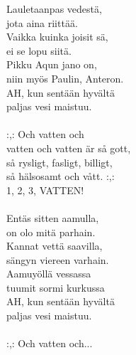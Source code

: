 
Lauletaanpas vedestä, \\ jota aina riittää. \\ Vaikka kuinka joisit sä, \\ ei se lopu siitä. \\ Pikku Aqun jano on, \\ niin myös Paulin, Anteron. \\ AH, kun sentään hyvältä \\ paljas vesi maistuu. \\ \hspace{10mm} \\ :,: Och vatten och \\ vatten och vatten är så gott, \\ så rysligt, fasligt, billigt, \\ så hälsosamt och vått. :,: \\ 1, 2, 3, VATTEN! \\ \hspace{10mm} \\ Entäs sitten aamulla, \\ on olo mitä parhain. \\ Kannat vettä saavilla, \\ sängyn viereen varhain. \\ Aamuyöllä vessassa \\ tuumit sormi kurkussa \\ AH, kun sentään hyvältä \\ paljas vesi maistuu. \\ \hspace{10mm} \\ :,: Och vatten och...